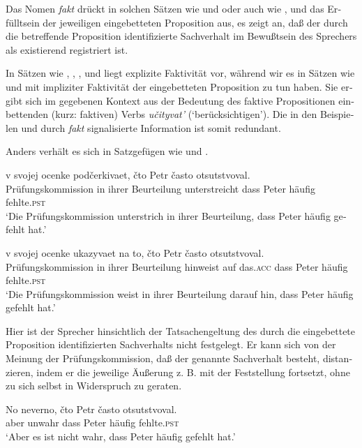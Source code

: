 \documentclass[output=paper]{langscibook}
\begin{document}
\begin{otherlanguage}{german}
Das Nomen \textit{fakt} drückt in solchen Sätzen wie  und  oder auch wie ,  und  das Erfülltsein der jeweiligen eingebetteten Proposition aus, es zeigt an, daß der durch die betreffende Proposition identifizierte Sachverhalt im Bewußtsein des Sprechers als existierend registriert ist.

In Sätzen wie , , ,  und  liegt explizite Faktivität vor, während wir es in Sätzen wie  und  mit impliziter Faktivität der eingebetteten Pro\-po\-sition zu tun haben. Sie ergibt sich im gegebenen Kontext aus der Bedeutung des faktive Propositionen einbettenden (kurz: faktiven) Verbs \textit{učityvat’} (‘be\-rück\-sich\-tigen’). Die in den Beispielen  und  durch \textit{fakt} signalisierte Information ist somit redundant.

Anders verhält es sich in Satzgefügen wie  und .

\ea \label{ex:zi83:42}
     v svojej ocenke podčerkivaet, čto Petr často otsutstvoval. \\
     Prüfungskommission in ihrer Beurteilung unterstreicht dass Peter häufig fehlte.\textsc{pst} \\
    \glt ‘Die Prüfungskommission unterstrich in ihrer Beurteilung, dass Peter häufig gefehlt hat.’
    
\ex \label{ex:zi83:43}
     v svojej ocenke ukazyvaet na to, čto Petr často otsutstvoval. \\
    Prüfungskommission in ihrer Beurteilung hinweist auf das.\textsc{acc} dass Peter häufig fehlte.\textsc{pst} \\
    \glt ‘Die Prüfungskommission weist in ihrer Beurteilung darauf hin, dass Peter häufig gefehlt hat.’
\z

\noindent Hier ist der Sprecher hinsichtlich der Tatsachengeltung des durch die eingebettete Proposition identifizierten Sachverhalts nicht festgelegt. Er kann sich von der Meinung der Prüfungskommission, daß der genannte Sachverhalt besteht, distanzieren, indem er die
jeweilige Äußerung z. B. mit der Feststellung  fortsetzt, ohne zu sich selbst in Widerspruch zu geraten.

\ea \label{ex:zi83:44}
    \gll No neverno, čto Petr často otsutstvoval. \\
    aber unwahr dass Peter häufig fehlte.\textsc{pst} \\
    \glt ‘Aber es ist nicht wahr, dass Peter häufig gefehlt hat.’
    

\end{otherlanguage}
\end{document}
